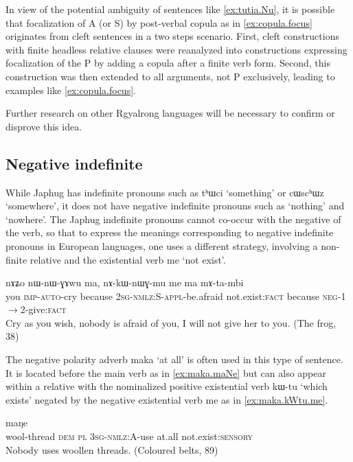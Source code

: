 \documentclass[oldfontcommands,oneside,a4paper,11pt]{article}
\newcommand{\ipa}[1]{{\phon #1}} %
\newcommand{\topic}{\textsc{dem}}
\begin{document}
In view of the potential ambiguity of   sentences like \ref{ex:tutia.Nu}, it is possible that focalization of A (or S) by post-verbal copula as in \ref{ex:copula.focus} originates from cleft sentences in a two steps scenario. First,  cleft constructions with finite headless relative clauses were reanalyzed  into constructions expressing focalization of the P by adding a copula after a finite verb form. Second,  this construction was then extended to all arguments, not P exclusively, leading to examples like \ref{ex:copula.focus}.

Further research on other Rgyalrong languages will be necessary to confirm or disprove this idea. 


\subsection{Negative indefinite}

While Japhug has indefinite pronouns such as \ipa{tʰɯci} `something' or \ipa{cɯscʰɯz} `somewhere', it does not have negative indefinite pronouns  such as `nothing' and `nowhere'. The Japhug indefinite pronouns cannot co-occur with the negative of the verb, so that to express the meanings corresponding to negative indefinite pronouns in European languages, one uses a different strategy, involving a non-finite relative and the existential verb \ipa{me} `not exist'.


\begin{exe}
   \ex  \label{ex:nAkWnWGmu}
\gll   
\ipa{nɤʑo}  	\ipa{nɯ-nɯ-ɣɤwu}  	\ipa{ma,}  	\ipa{nɤ-kɯ-nɯɣ-mu}  	\ipa{me}  	\ipa{ma}  	\ipa{mɤ-ta-mbi}  \\
you \textsc{imp-auto}-cry because \textsc{2sg-nmlz:S-appl}-be.afraid not.exist:\textsc{fact} because \textsc{neg-1$\rightarrow$2-}give:\textsc{fact} \\
\glt Cry as you wish, nobody is afraid of you, I will not give her to you.  (The frog, 38)
\end{exe}

The negative polarity adverb \ipa{maka} `at all' is often used in this type of sentence. It is located before the main verb as in \ref{ex:maka.maNe} but can also appear  within a  relative with the nominalized positive existential verb \ipa{kɯ-tu} `which exists' negated by the negative existential verb \ipa{me} as in \ref{ex:maka.kWtu.me}.

\begin{exe}
   \ex  \label{ex:maka.maNe}
\gll   
[\ipa{smɤɣ-ri}  	\ipa{nɯ}  	\ipa{ra}  	\ipa{ɯ-kɯ-ntɕʰoz}]  	\ipa{maka}  	\ipa{maŋe}   \\
wool-thread \topic{} \textsc{pl} \textsc{3sg-nmlz:A}-use at.all not.exist:\textsc{sensory}  \\
\glt Nobody uses woollen threads. (Coloured belts, 89)
\end{exe}
 
\end{document}
